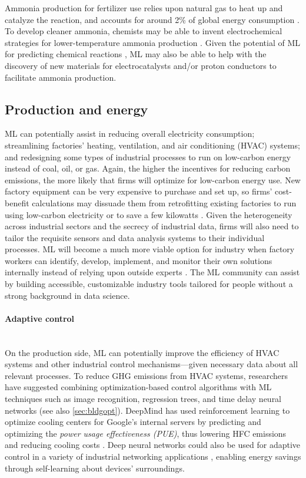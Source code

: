 \documentclass[11pt]{report}
\newcommand{\Gap}{\texorpdfstring{\hfill}{}}
\newcommand{\Rec}{\texorpdfstring{{\small\emph{\color{blue}{\fbox{High Leverage}}}}}{}}
\begin{document}
Ammonia production for fertilizer use relies upon natural gas to heat up and catalyze the reaction, and accounts for around 2\% of global energy consumption \cite{montoya2015challenge}. To develop cleaner ammonia, chemists may be able to invent electrochemical strategies for lower-temperature ammonia production \cite{montoya2015challenge, wood2004review}. Given the potential of ML for predicting chemical reactions \cite{coley2019graph}, ML may also be able to help with the discovery of new materials for electrocatalysts and/or proton conductors to facilitate ammonia production.

\subsection{Production and energy}
\label{sec:demandresponse}
ML can potentially assist in reducing overall electricity consumption; streamlining factories' heating, ventilation, and air conditioning (HVAC) systems; and redesigning some types of industrial processes to run on low-carbon energy instead of coal, oil, or gas. Again, the higher the incentives for reducing carbon emissions, the more likely that firms will optimize for low-carbon energy use. New factory equipment can be very expensive to purchase and set up, so firms' cost-benefit calculations may dissuade them from retrofitting existing factories to run using low-carbon electricity or to save a few kilowatts \cite{gillingham2018cost, plambeck2012reducing, tao2010innovation}. Given the heterogeneity across industrial sectors and the secrecy of industrial data, firms will also need to tailor the requisite sensors and data analysis systems to their individual processes. ML will become a much more viable option for industry when factory workers can identify, develop, implement, and monitor their own solutions internally instead of relying upon outside experts \cite{helper2019profits}. The ML community can assist by building accessible, customizable industry tools tailored for people without a strong background in data science. 

\paragraph*{Adaptive control}\Gap \Rec\mbox{}\\\label{sec:adaptivecontrol}On the production side, ML can potentially improve the efficiency of HVAC systems and other industrial control mechanisms---given necessary data about all relevant processes. To reduce GHG emissions from HVAC systems, researchers have suggested combining optimization-based control algorithms with ML techniques such as image recognition, regression trees, and time delay neural networks \cite{aftab2017automatic, DRGONA2018199} (see also \ref{sec:bldgopt}). DeepMind has used reinforcement learning to optimize cooling centers for Google's internal servers by predicting and optimizing the \emph{power usage effectiveness (PUE)}, thus lowering HFC emissions and reducing cooling costs \cite{evans2016deepmind, gao2014}. Deep neural networks could also be used for adaptive control in a variety of industrial networking applications \cite{ahmed2016green}, enabling energy savings through self-learning about devices' surroundings.
\end{document}
